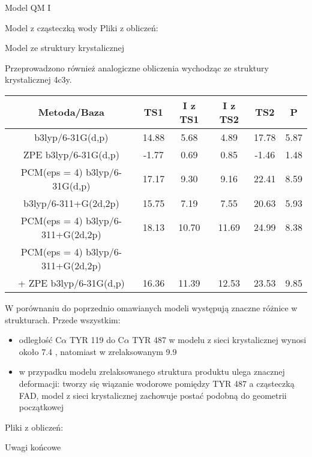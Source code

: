 \begin{section}{Model QM I}
\begin{subsection}{Model z cząsteczką wody}
Pliki z obliczeń:
  
 \end{subsection}

  
 \begin{subsection}{Model ze struktury krystalicznej}
 
 Przeprowadzono również analogiczne obliczenia wychodząc ze struktury krystalicznej 4c3y.
  
      \begin{tabular}{||c c c c c c||} 
 \hline
 Metoda/Baza & TS1 & I z TS1 & I z TS2 & TS2 & P \\ [0.5ex] 
 \hline\hline
b3lyp/6-31G(d,p) & 14.88 &  5.68 & 4.89 & 17.78 & 5.87 \\
ZPE b3lyp/6-31G(d,p) & -1.77  & 0.69 &  0.85  & -1.46 & 1.48 \\
PCM(eps = 4) b3lyp/6-31G(d,p) & 17.17  & 9.30 & 9.16 & 22.41 & 8.59 \\
b3lyp/6-311+G(2d,2p) & 15.75  & 7.19  & 7.55 & 20.63 & 5.93 \\
PCM(eps = 4) b3lyp/6-311+G(2d,2p) & 18.13  & 10.70 & 11.69  & 24.99 & 8.38 \\
PCM(eps = 4) b3lyp/6-311+G(2d,2p) & & & & & \\ 
+ ZPE b3lyp/6-31G(d,p)  & 16.36  & 11.39  & 12.53 & 23.53 & 9.85 \\
 \hline
 
\end{tabular}

W porównaniu do poprzednio omawianych modeli występują znaczne różnice w strukturach. Przede wszystkim:
\begin{itemize}
 \item odległość C$\alpha$ TYR 119 do C$\alpha$ TYR 487 w modelu z sieci krystalicznej wynosi około 7.4 \angstrom, natomiast w zrelaksowanym 9.9 \angstrom
 \item w przypadku modelu zrelaksowanego struktura produktu ulega znacznej deformacji: tworzy się wiązanie wodorowe pomiędzy TYR 487 a cząsteczką FAD, model z sieci krystalicznej zachowuje
 postać podobną do geometrii początkowej
\end{itemize}

  
  Pliki z obliczeń:
 \end{subsection}

 \begin{subsection}{Uwagi końcowe}
 

\end{subsection}
\end{section}
